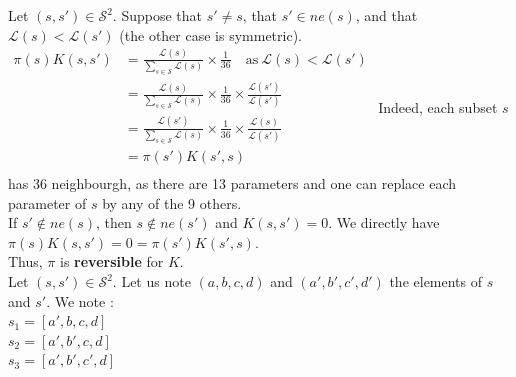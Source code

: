 Let $(s, s') \in \mathcal{S}^2$. Suppose that $ s' \neq s$, that  $s' \in ne(s)$, and that $\mathcal{L}(s) < \mathcal{L}(s')$ (the other case is symmetric). \\[0.15cm]
$
\begin{aligned}
    \pi(s)K(s, s') &=  \frac{\mathcal{L}(s)}{\sum_{s \in \mathcal{S}} \mathcal{L}(s)} \times \frac{1}{36} \quad \text{as} \ \mathcal{L}(s) < \mathcal{L}(s') \\
    &=  \frac{\mathcal{L}(s)}{\sum_{s \in \mathcal{S}} \mathcal{L}(s)} \times \frac{1}{36} \times \frac{\mathcal{L}(s')}{\mathcal{L}(s')} \\
    &=  \frac{\mathcal{L}(s')}{\sum_{s \in \mathcal{S}} \mathcal{L}(s)} \times \frac{1}{36} \times \frac{\mathcal{L}(s)}{\mathcal{L}(s')} \\
    &= \pi(s')K(s', s)\\[0.3cm]
\end{aligned}
$
\newline
Indeed, each subset $s$ has 36 neighbourgh, as there are 13 parameters and one can replace each parameter of $s$ by any of the 9 others. \\

If $s' \notin ne(s)$, then $s \notin ne(s')$ and $K(s, s') = 0$.
We directly have $\pi(s)K(s, s') = 0 = \pi(s')K(s', s)$.\\

Thus, $\pi$ is \textbf{reversible} for $K$.\\[0.3cm]
Let $(s, s') \in \mathcal{S}^2$. Let us note $(a, b, c, d)$ and $(a', b', c', d')$ the elements of $s$ and $s'$.
We note : \\
$s_1 = [a', b, c, d]$\\
$ s_2 = [a', b', c, d]$ \\
$s_3 = [a', b', c', d]$ \\


